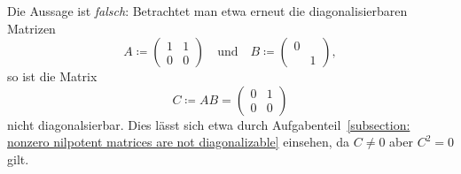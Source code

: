 Die Aussage ist \emph{falsch}:
Betrachtet man etwa erneut die diagonalisierbaren Matrizen
\[
            A
  \coloneqq \begin{pmatrix}
              1 & 1
              \\
              0 & 0
            \end{pmatrix}
  \quad\text{und}\quad
            B
  \coloneqq \begin{pmatrix}
              0 & 
              \\
                & 1
            \end{pmatrix},
\]
so ist die Matrix
\[
            C            
  \coloneqq AB
  =         \begin{pmatrix}
            0 & 1
            \\
            0 & 0
            \end{pmatrix}
\]
nicht diagonalsierbar.
Dies lässt sich etwa durch Aufgabenteil~\ref{subsection: nonzero nilpotent matrices are not diagonalizable} einsehen, da $C \neq 0$ aber $C^2 = 0$ gilt.

